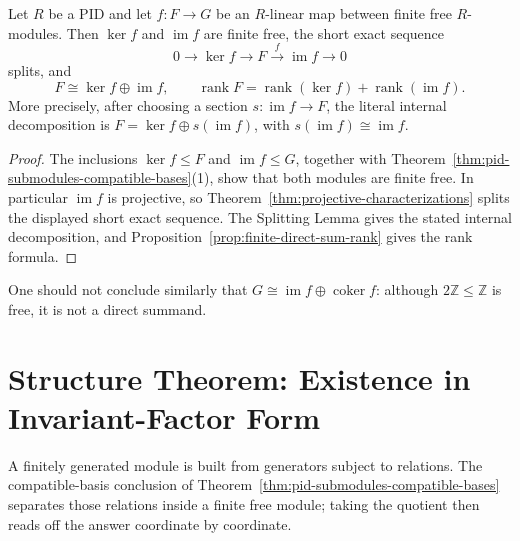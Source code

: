 \begin{corollary}
\label{cor:pid-rank-nullity}
Let \(R\) be a PID and let \(f:F\to G\) be an \(R\)-linear map between
finite free \(R\)-modules. Then \(\ker f\) and \(\operatorname{im}f\) are
finite free, the short exact sequence
\[
0\longrightarrow\ker f\longrightarrow F
\xrightarrow{f}\operatorname{im}f\longrightarrow0
\]
splits, and
\[
F\cong\ker f\oplus\operatorname{im}f,
\qquad
\operatorname{rank}F
=\operatorname{rank}(\ker f)+\operatorname{rank}(\operatorname{im}f).
\]
More precisely, after choosing a section
\(s:\operatorname{im}f\to F\), the literal internal decomposition is
\(F=\ker f\oplus s(\operatorname{im}f)\), with
\(s(\operatorname{im}f)\cong\operatorname{im}f\).
\end{corollary}
\begin{proof}
The inclusions \(\ker f\leq F\) and \(\operatorname{im}f\leq G\), together
with Theorem~\ref{thm:pid-submodules-compatible-bases}(1), show that both
modules are finite free. In particular \(\operatorname{im}f\) is projective,
so Theorem~\ref{thm:projective-characterizations} splits the displayed short
exact sequence. The Splitting Lemma gives the stated internal decomposition,
and Proposition~\ref{prop:finite-direct-sum-rank} gives the rank formula.
\end{proof}

One should not conclude similarly that
\(G\cong\operatorname{im}f\oplus\operatorname{coker}f\): although
\(2\mathbb Z\leq\mathbb Z\) is free, it is not a direct summand.

\section{Structure Theorem: Existence in Invariant-Factor Form}
\label{sec:pid-structure-existence}
A finitely generated module is built from generators subject to relations.
The compatible-basis conclusion of Theorem~\ref{thm:pid-submodules-compatible-bases}
separates those relations inside a finite free module; taking the quotient
then reads off the answer coordinate by coordinate.

